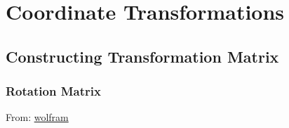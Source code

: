 \newpage
\chapter{Coordinate Transformations}

\localtableofcontents*

\newpage

\section{Constructing Transformation Matrix}

\subsection{Rotation Matrix}

From: \href{https://mathworld.wolfram.com/RotationMatrix.html}{wolfram}

